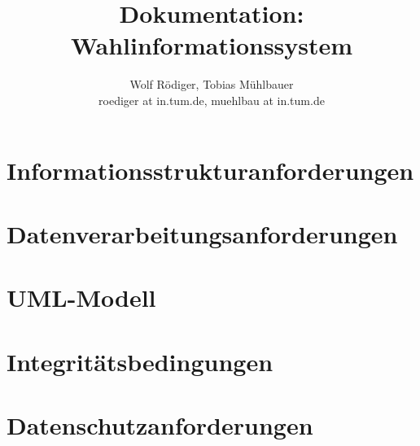 \documentclass[a4paper]{article}
\author{Wolf Rödiger, Tobias Mühlbauer \\ roediger at in.tum.de, muehlbau at in.tum.de}
\title{Dokumentation: Wahlinformationssystem}
\begin{document}
\maketitle

\newpage

\tableofcontents

\newpage

\section{Informationsstrukturanforderungen}

\section{Datenverarbeitungsanforderungen}

\section{UML-Modell}

\section{Integritätsbedingungen}

\section{Datenschutzanforderungen}
\end{document}
